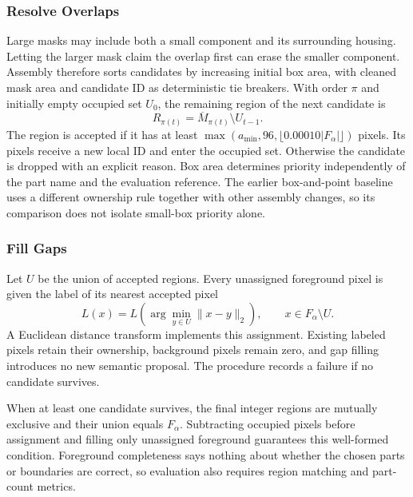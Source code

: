 \documentclass[pdflatex,iicol,sn-apa]{sn-jnl}
\begin{document}
\subsubsection{Resolve Overlaps}
Large masks may include both a small component and its surrounding housing. Letting the larger mask claim the overlap first can erase the smaller component. Assembly therefore sorts candidates by increasing initial box area, with cleaned mask area and candidate ID as deterministic tie breakers. With order $\pi$ and initially empty occupied set $U_0$, the remaining region of the next candidate is
\begin{equation}
R_{\pi(t)}=\overline M_{\pi(t)}\setminus U_{t-1}.
\label{eq:overlap}
\end{equation}
The region is accepted if it has at least $\max(a_{\min},96,\lfloor0.00010|F_{\alpha}|\rfloor)$ pixels. Its pixels receive a new local ID and enter the occupied set. Otherwise the candidate is dropped with an explicit reason. Box area determines priority independently of the part name and the evaluation reference. The earlier box-and-point baseline uses a different ownership rule together with other assembly changes, so its comparison does not isolate small-box priority alone.

\subsubsection{Fill Gaps}
Let $U$ be the union of accepted regions. Every unassigned foreground pixel is given the label of its nearest accepted pixel
\begin{equation}
L(x)=L\!\left(\arg\min_{y\in U}\|x-y\|_2\right),
\qquad x\in F_{\alpha}\setminus U.
\label{eq:gaps}
\end{equation}
A Euclidean distance transform implements this assignment. Existing labeled pixels retain their ownership, background pixels remain zero, and gap filling introduces no new semantic proposal. The procedure records a failure if no candidate survives.

When at least one candidate survives, the final integer regions are mutually exclusive and their union equals $F_{\alpha}$. Subtracting occupied pixels before assignment and filling only unassigned foreground guarantees this well-formed condition. Foreground completeness says nothing about whether the chosen parts or boundaries are correct, so evaluation also requires region matching and part-count metrics.
\end{document}
